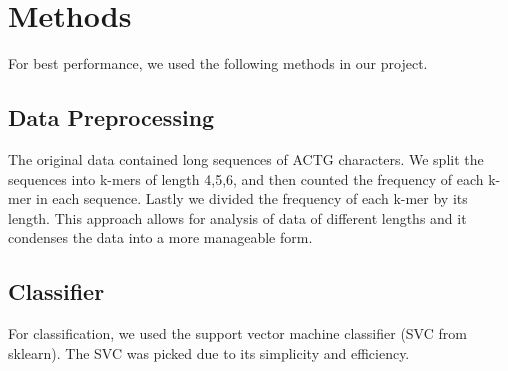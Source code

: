 \section{Methods}
For best performance, we used the following methods in our project.
\subsection{Data Preprocessing}
The original data contained long sequences of ACTG characters. We split the sequences into k-mers of length 4,5,6, and then counted the frequency of each k-mer in each sequence. Lastly we divided the frequency of each k-mer by its length.
This approach allows for analysis of data of different lengths and it condenses the data into a more manageable form.



\subsection{Classifier}
For classification, we used the support vector machine classifier (SVC from sklearn). The SVC was picked due to its simplicity and efficiency.

